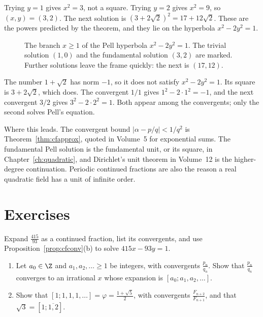 \begin{examplex}[the solution for $d=2$]
Trying $y=1$ gives $x^2=3$, not a square. Trying $y=2$ gives $x^2=9$, so $(x,y)=(3,2)$. The next solution is $(3+2\sqrt 2)^2=17+12\sqrt 2$. These are the powers predicted by the theorem, and they lie on the hyperbola $x^2-2y^2=1$.
\end{examplex}

\begin{figure}[ht]
\centering
{}
\caption{The branch $x\ge 1$ of the Pell hyperbola $x^2-2y^2=1$. The trivial solution $(1,0)$ and the fundamental solution $(3,2)$ are marked. Further solutions leave the frame quickly: the next is $(17,12)$.}
\label{fig:t1-pell}
\end{figure}

\begin{examplex}
The number $1+\sqrt 2$ has norm $-1$, so it does not satisfy $x^2-2y^2=1$. Its square is $3+2\sqrt 2$, which does. The convergent $1/1$ gives $1^2-2\cdot 1^2=-1$, and the next convergent $3/2$ gives $3^2-2\cdot 2^2=1$. Both appear among the convergents; only the second solves Pell's equation.
\end{examplex}

\begin{beauty}
Where this leads. The convergent bound $|\alpha-p/q|<1/q^2$ is Theorem~\ref{thm:cfapprox}, quoted in Volume~5 for exponential sums. The fundamental Pell solution is the fundamental unit, or its square, in Chapter~\ref{ch:quadratic}, and Dirichlet's unit theorem in Volume~12 is the higher-degree continuation. Periodic continued fractions are also the reason a real quadratic field has a unit of infinite order.
\end{beauty}

\section{Exercises}

\begin{exercise}[$\star$]\label{ex:cf415}
Expand $\frac{415}{93}$ as a continued fraction, list its convergents, and use Proposition~\ref{prop:cfconv}(b) to solve $415x-93y=1$.
\end{exercise}

\begin{exercise}[$\star\star$]\label{ex:cfunique}
\begin{enumerate}[label=(\alph*)]
\item Let $a_0\in\Z$ and $a_1,a_2,\dots\ge1$ be integers, with convergents $\frac{p_n}{q_n}$. Show that $\frac{p_n}{q_n}$ converges to an irrational $x$ whose expansion is $[a_0;a_1,a_2,\dots]$.
\item Show that $[1;1,1,1,\dots]=\varphi=\frac{1+\sqrt5}2$, with convergents $\frac{F_{n+2}}{F_{n+1}}$, and that $\sqrt3=[1;\overline{1,2}]$.
\end{enumerate}
\end{exercise}


